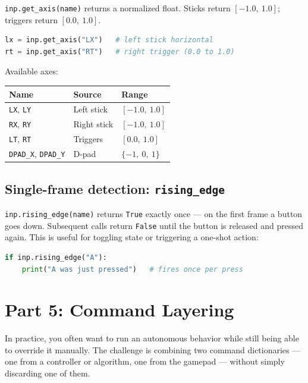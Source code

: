 \documentclass[11pt,a4paper]{article}
\begin{document}
\texttt{inp.get\_axis(name)} returns a normalized float. Sticks return $[-1.0,\ 1.0]$; triggers return $[0.0,\ 1.0]$.

\begin{lstlisting}[language=Python]
lx = inp.get_axis("LX")   # left stick horizontal
rt = inp.get_axis("RT")   # right trigger (0.0 to 1.0)
\end{lstlisting}

Available axes:

\begin{center}
\begin{tabular}{|l|l|l|}
\hline
\textbf{Name} & \textbf{Source} & \textbf{Range} \\
\hline
\texttt{LX}, \texttt{LY} & Left stick & $[-1.0,\ 1.0]$ \\
\texttt{RX}, \texttt{RY} & Right stick & $[-1.0,\ 1.0]$ \\
\texttt{LT}, \texttt{RT} & Triggers & $[0.0,\ 1.0]$ \\
\texttt{DPAD\_X}, \texttt{DPAD\_Y} & D-pad & $\{-1,\ 0,\ 1\}$ \\
\hline
\end{tabular}
\end{center}

\subsection*{Single-frame detection: \texttt{rising\_edge}}

\texttt{inp.rising\_edge(name)} returns \texttt{True} exactly once — on the first frame a button goes down. Subsequent calls return \texttt{False} until the button is released and pressed again. This is useful for toggling state or triggering a one-shot action:

\begin{lstlisting}[language=Python]
if inp.rising_edge("A"):
    print("A was just pressed")   # fires once per press
\end{lstlisting}

\section{Part 5: Command Layering}

In practice, you often want to run an autonomous behavior while still being able to override it manually. The challenge is combining two command dictionaries — one from a controller or algorithm, one from the gamepad — without simply discarding one of them.
\end{document}

